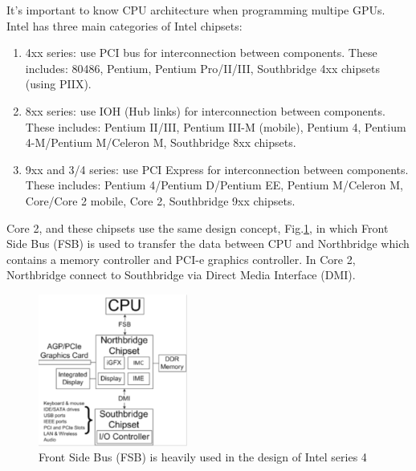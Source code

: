 It's important to know CPU architecture when programming multipe GPUs.
Intel has three main categories of Intel chipsets:
\begin{enumerate}
  \item 4xx series: use PCI bus for interconnection between components. These
  includes: 80486, Pentium, Pentium Pro/II/III, Southbridge 4xx chipsets (using
  PIIX).
  \item 8xx series: use IOH (Hub links) for interconnection between components.
  These includes: Pentium II/III, Pentium III-M (mobile), Pentium 4, Pentium
  4-M/Pentium M/Celeron M, Southbridge 8xx chipsets.
  \item 9xx and 3/4 series: use PCI Express for interconnection between
  components.
  These includes: Pentium 4/Pentium D/Pentium EE, Pentium M/Celeron M, Core/Core
  2 mobile, Core 2, Southbridge 9xx chipsets.
\end{enumerate}
Core 2, and these chipsets use the same design concept,
Fig.\ref{fig:Intel_series4}, in which Front Side Bus (FSB) is used to transfer
the data between CPU and Northbridge which contains a memory controller and
PCI-e graphics controller. In Core 2, Northbridge connect to Southbridge via
Direct Media Interface (DMI).

\begin{figure}[hbt]
  \centerline{\includegraphics[height=5cm,
    angle=0]{./images/Intel_series4.eps}}
\caption{Front Side Bus (FSB) is heavily used in the design of Intel series 4}
\label{fig:Intel_series4}
\end{figure}

